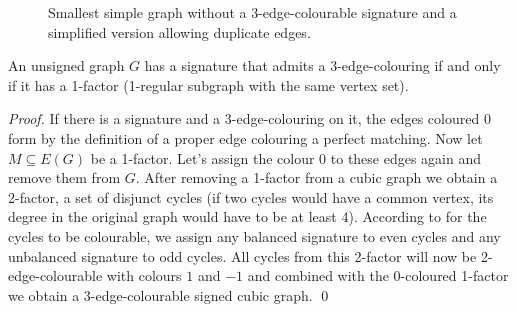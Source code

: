 \begin{figure}[h]
    \hspace{0.1\textwidth}

    \caption[Smallest simple graph without a 3-edge-colourable signature]{Smallest simple graph without a 3-edge-colourable signature and a simplified version allowing duplicate edges.}
\end{figure}

\begin{theorem}
    An unsigned graph $G$ has a signature that admits a 3-edge-colouring if and only if it has a 1-factor (1-regular subgraph with the same vertex set).
\end{theorem}

\textit{Proof.} If there is a signature and a 3-edge-colouring on it, the edges coloured $0$ form by the definition of a proper edge colouring a perfect matching. Now let $M \subseteq E(G)$ be a 1-factor. Let's assign the colour $0$ to these edges again and remove them from $G$. After removing a 1-factor from a cubic graph we obtain a 2-factor, a set of disjunct cycles (if two cycles would have a common vertex, its degree in the original graph would have to be at least 4). According to  for the cycles to be colourable, we assign any balanced signature to even cycles and any unbalanced signature to odd cycles. All cycles from this 2-factor will now be 2-edge-colourable with colours $1$ and $-1$ and combined with the $0$-coloured 1-factor we obtain a 3-edge-colourable signed cubic graph. \qed

